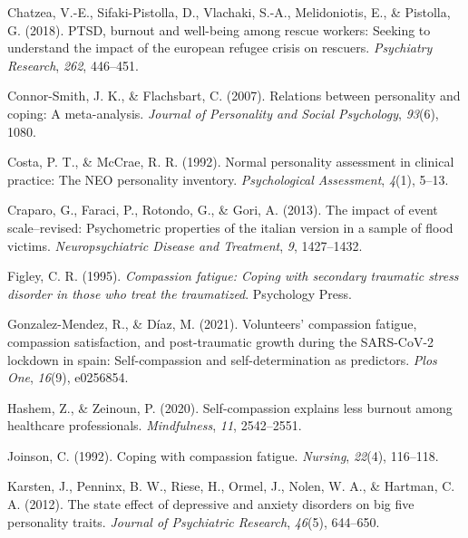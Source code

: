 \documentclass[
  man]{apa6}
\newlength{\cslhangindent}
\newlength{\cslentryspacingunit} %
\newenvironment{CSLReferences}[2] %
 {%
  \setlength{\parindent}{0pt}
  \ifodd #1
  \let\oldpar\par
  \def\par{\hangindent=\cslhangindent\oldpar}
  \fi
  \setlength{\parskip}{#2\cslentryspacingunit}
 }%
 {}
\begin{document}
\begin{CSLReferences}{1}{0}
\leavevmode{}%
Chatzea, V.-E., Sifaki-Pistolla, D., Vlachaki, S.-A., Melidoniotis, E., \& Pistolla, G. (2018). PTSD, burnout and well-being among rescue workers: Seeking to understand the impact of the european refugee crisis on rescuers. \emph{Psychiatry Research}, \emph{262}, 446--451.

\leavevmode{}%
Connor-Smith, J. K., \& Flachsbart, C. (2007). Relations between personality and coping: A meta-analysis. \emph{Journal of Personality and Social Psychology}, \emph{93}(6), 1080.

\leavevmode{}%
Costa, P. T., \& McCrae, R. R. (1992). Normal personality assessment in clinical practice: The NEO personality inventory. \emph{Psychological Assessment}, \emph{4}(1), 5--13.

\leavevmode{}%
Craparo, G., Faraci, P., Rotondo, G., \& Gori, A. (2013). The impact of event scale--revised: Psychometric properties of the italian version in a sample of flood victims. \emph{Neuropsychiatric Disease and Treatment}, \emph{9}, 1427--1432.

\leavevmode{}%
Figley, C. R. (1995). \emph{Compassion fatigue: Coping with secondary traumatic stress disorder in those who treat the traumatized}. Psychology Press.

\leavevmode{}%
Gonzalez-Mendez, R., \& Díaz, M. (2021). Volunteers' compassion fatigue, compassion satisfaction, and post-traumatic growth during the SARS-CoV-2 lockdown in spain: Self-compassion and self-determination as predictors. \emph{Plos One}, \emph{16}(9), e0256854.

\leavevmode{}%
Hashem, Z., \& Zeinoun, P. (2020). Self-compassion explains less burnout among healthcare professionals. \emph{Mindfulness}, \emph{11}, 2542--2551.

\leavevmode{}%
Joinson, C. (1992). Coping with compassion fatigue. \emph{Nursing}, \emph{22}(4), 116--118.

\leavevmode{}%
Karsten, J., Penninx, B. W., Riese, H., Ormel, J., Nolen, W. A., \& Hartman, C. A. (2012). The state effect of depressive and anxiety disorders on big five personality traits. \emph{Journal of Psychiatric Research}, \emph{46}(5), 644--650.


\end{CSLReferences}
\end{document}
